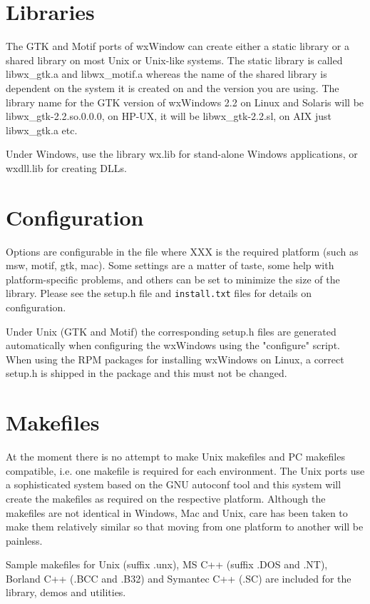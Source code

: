 \section{Libraries}

The GTK and Motif ports of wxWindow can create either a static library or a shared
library on most Unix or Unix-like systems. The static library is called libwx\_gtk.a
and libwx\_motif.a whereas the name of the shared library is dependent on the
system it is created on and the version you are using. The library name for the
GTK version of wxWindows 2.2 on Linux and Solaris will be libwx\_gtk-2.2.so.0.0.0,
on HP-UX, it will be libwx\_gtk-2.2.sl, on AIX just libwx\_gtk.a etc.

Under Windows, use the library wx.lib for stand-alone Windows
applications, or wxdll.lib for creating DLLs.

\section{Configuration}

Options are configurable in the file
 where XXX is the required platform (such as msw, motif, gtk, mac). Some 
settings are a matter of taste, some help with platform-specific problems, and
others can be set to minimize the size of the library. Please see the setup.h file
and {\tt install.txt} files for details on configuration.

Under Unix (GTK and Motif) the corresponding setup.h files are generated automatically
when configuring the wxWindows using the "configure" script. When using the RPM packages
for installing wxWindows on Linux, a correct setup.h is shipped in the package and
this must not be changed.

\section{Makefiles}

At the moment there is no attempt to make Unix makefiles and
PC makefiles compatible, i.e. one makefile is required for
each environment. The Unix ports use a sophisticated system based
on the GNU autoconf tool and this system will create the
makefiles as required on the respective platform. Although the
makefiles are not identical in Windows, Mac and Unix, care has
been taken to make them relatively similar so that moving from
one platform to another will be painless.

Sample makefiles for Unix (suffix .unx), MS C++ (suffix .DOS and .NT), Borland
C++ (.BCC and .B32) and Symantec C++ (.SC) are included for the library, demos
and utilities.

